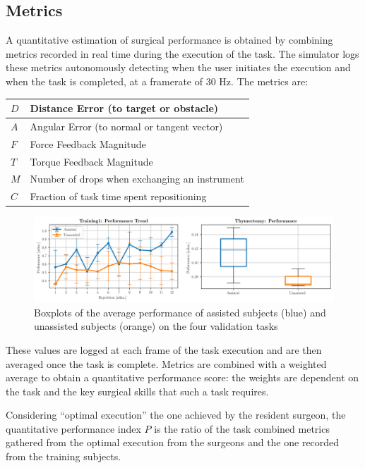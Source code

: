 \documentclass{article}
\begin{document}
\begin{multicols}{2}
\subsection{Metrics}
A quantitative estimation of surgical performance is obtained by combining metrics recorded in real time during the execution of the task. The simulator logs these metrics autonomously detecting when the user initiates the execution and when the task is completed, at a framerate of 30 Hz. The metrics are:
\begin{center}
  \begin{tabular}{||p{ }|p{ }||}
      \hline
      $D$ & Distance Error (to target or obstacle)\\
      \hline
      $A$ & Angular Error  (to normal or tangent vector)\\
      \hline
      $F$ & Force Feedback Magnitude\\
      \hline
      $T$ & Torque Feedback Magnitude\\
      \hline
      $M$ & Number of drops when exchanging an instrument\\
      \hline
      $C$ & Fraction of task time spent repositioning   \\
      \hline
  \end{tabular}
\end{center}
\begin{figure}
  \centering
      \includegraphics[width=\linewidth]{images/results_compact.png}
      \caption{Boxplots of the average performance of assisted subjects (blue) and unassisted subjects (orange) on the four validation tasks}
      \label{fig:results_compact}
\end{figure}

These values are logged at each frame of the task execution and are then averaged once the task is complete. Metrics are combined with a weighted average to obtain a quantitative performance score: the weights are dependent on the task and the key surgical skills that such a task requires. 

Considering ``optimal execution'' the one achieved by the resident surgeon, the quantitative performance index $P$ is the ratio of the task combined metrics gathered from the optimal execution from the surgeons and the one recorded from the training subjects. 


\end{multicols}
\end{document}
